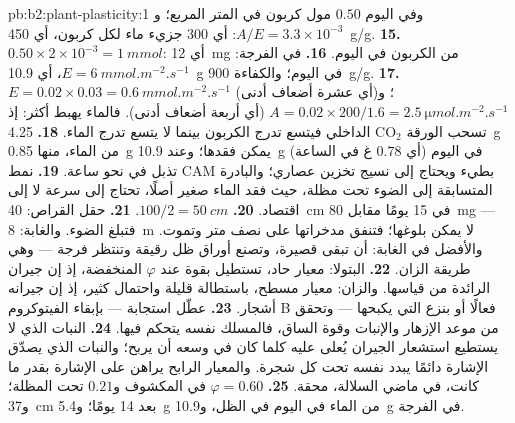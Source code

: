 \begin{solution}{pb:b2:plant-plasticity:1}
وفي اليوم $0.50$ مول كربون في المتر المربع؛ و$A/E = 3.3\times
10^{-3}$: أي 300 جزيء ماء لكل كربون، أي \qty{450}{g/g}.
\textbf{15.} $0.50\times 2\times 10^{-3} = \qty{1}{mmol}$: أي \qty{12}{mg}
من الكربون في اليوم.
\textbf{16.} في الفرجة: $E = \qty{6}{mmol.m^{-2}.s^{-1}}$، أي \qty{10.9}{g} في
اليوم؛ والكفاءة \qty{900}{g/g}.
\textbf{17.} $E = 0.02\times 0.03 = \qty{0.6}{mmol.m^{-2}.s^{-1}}$
(أي عشرة أضعاف أدنى)؛ و$A = 0.02\times 200/1.6 = \qty{2.5}{\micro
mol.m^{-2}.s^{-1}}$ (أي أربعة أضعاف أدنى). فالماء يهبط أكثر: إذ
تسحب الورقة $\mathrm{CO_2}$ الداخلي فيتسع تدرج الكربون
بينما لا يتسع تدرج الماء.
\textbf{18.} \qty{4.25}{g} من الماء، منها \qty{0.85}{g} يمكن فقدها؛ وعند
\qty{10.9}{g} في اليوم (أي $0.78$ غ في الساعة) تذبل في نحو ساعة.
\textbf{19.} نمط CAM بطيء ويحتاج إلى نسيج تخزين عصاري؛ والبادرة
المتسابقة إلى الضوء تحت مظلة، حيث فقد الماء صغير
أصلًا، تحتاج إلى سرعة لا إلى اقتصاد.
\textbf{20.} $100/2 = \qty{50}{cm}$.
\textbf{21.} حقل القراص: \qty{40}{cm} في 15 يومًا مقابل \qty{80}{mg} ---
فتبلغ الضوء. والغابة: \qty{8}{m} لا يمكن بلوغها؛ فتنفق
مدخراتها على نصف متر وتموت. والأفضل في الغابة: أن تبقى قصيرة،
وتصنع أوراق ظل رقيقة وتنتظر فرجة --- وهي طريقة الزان.
\textbf{22.} البتولا: معيار حاد، تستطيل بقوة عند
$\varphi$ المنخفضة، إذ إن جيران الرائدة من قياسها. والزان:
معيار مسطح، باستطالة قليلة واحتمال كثير، إذ إن جيرانه
أشجار.
\textbf{23.} عطّل استجابة  --- بإبقاء
الفيتوكروم B فعالًا أو بنزع  التي
يكبحها --- وتحقق من موعد الإزهار والإنبات وقوة
الساق، فالمسلك نفسه يتحكم فيها.
\textbf{24.} النبات الذي لا يستطيع استشعار الجيران يُعلى عليه
كلما كان في وسعه أن يربح؛ والنبات الذي يصدّق الإشارة دائمًا
يبدد نفسه تحت كل شجرة. والمعيار الرابح يراهن على
الإشارة بقدر ما كانت، في ماضي السلالة،
محقة.
\textbf{25.} $\varphi = 0.60$ في المكشوف و$0.21$ تحت المظلة؛
و\qty{37}{cm} بعد 14 يومًا؛ و\qty{5.4}{g} من الماء في اليوم في الظل،
و\qty{10.9}{g} في الفرجة.
\end{solution}

